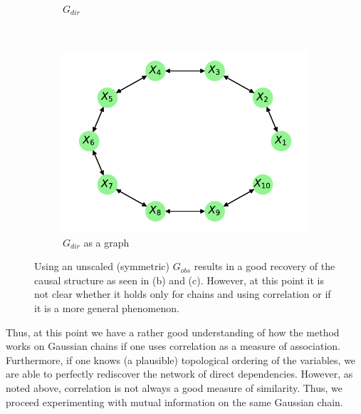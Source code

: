 \documentclass[../Thesis.tex]{subfiles}
\begin{document}
\begin{figure}[ht]
\begin{subfigure}[t]{0.49\textwidth}
        \caption{$G_{dir}$}
        \label{subfig:Gaussian chain symmetric G_obs using correlation - G_dir - unscaled}
    \end{subfigure}
    \\[\baselineskip]
    \begin{subfigure}[t]{0.49\textwidth}
        \centering
        \includegraphics[width=.9\linewidth]{figures/Gaussian Chain Theoretical/Chain graph from symmetric G obs - unscaled.pdf}
        \caption{$G_{dir}$ as a graph}
    \end{subfigure}
    \caption{Using an unscaled (symmetric) $G_{obs}$ results in a good recovery of the causal structure as seen in (b) and (c). However, at this point it is not clear whether it holds only for chains and using correlation or if it is a more general phenomenon.}
    \label{fig:Gaussian chain symmetric G_obs using correlation - unscaled}
\end{figure}
Thus, at this point we have a rather good understanding of how the method works on Gaussian chains if one uses correlation as a measure of association. Furthermore, if one knows (a plausible) topological ordering of the variables, we are able to perfectly rediscover the network of direct dependencies. However, as noted above, correlation is not always a good measure of similarity. Thus, we proceed experimenting with mutual information on the same Gaussian chain.

\end{document}
